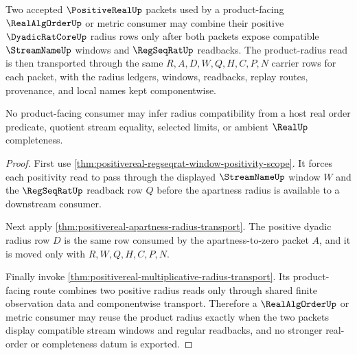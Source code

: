 \begin{theorem}
\label{thm:positivereal-product-radius-window-compatibility}
Two accepted $\PositiveRealUp$ packets used by a product-facing
$\RealAlgOrderUp$ or metric consumer may combine their positive
$\DyadicRatCoreUp$ radius rows only after both packets expose compatible
$\StreamNameUp$ windows and $\RegSeqRatUp$ readbacks. The product-radius read is
then transported through the same $R,A,D,W,Q,H,C,P,N$ carrier rows for each
packet, with the radius ledgers, windows, readbacks, replay routes, provenance,
and local names kept componentwise.

No product-facing consumer may infer radius compatibility from a host real
order predicate, quotient stream equality, selected limits, or ambient
$\RealUp$ completeness.
\end{theorem}
\begin{proof}
First use \autoref{thm:positivereal-regseqrat-window-positivity-scope}. It
forces each positivity read to pass through the displayed $\StreamNameUp$ window
$W$ and the $\RegSeqRatUp$ readback row $Q$ before the apartness radius is
available to a downstream consumer.

Next apply \autoref{thm:positivereal-apartness-radius-transport}. The positive
dyadic radius row $D$ is the same row consumed by the apartness-to-zero packet
$A$, and it is moved only with $R,W,Q,H,C,P,N$.

Finally invoke \autoref{thm:positivereal-multiplicative-radius-transport}. Its
product-facing route combines two positive radius reads only through shared
finite observation data and componentwise transport. Therefore a
$\RealAlgOrderUp$ or metric consumer may reuse the product radius exactly when
the two packets display compatible stream windows and regular readbacks, and no
stronger real-order or completeness datum is exported.
\end{proof}

